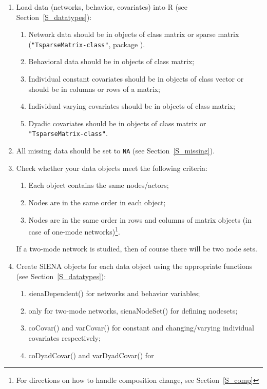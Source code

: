 \documentclass[a4paper,fleqn,11pt]{article}
\newcommand{\+}{\, + \,}
\newcommand{\sfn}[1]{\textsf{#1}}
\newcommand{\R}{{\sf R }}
\newcommand{\SI}{{\sf SIENA }}
\begin{document}
   \begin{enumerate}
	\item	Load data (networks, behavior, covariates) into \R
            (see Section~\ref{S_datatypes}):
	\begin{enumerate}
		\item Network data should be in objects of class matrix or
            sparse matrix\\ (\texttt{"TsparseMatrix-class"}, package ).
		\item	Behavioral data should be in objects of class matrix;
		\item	Individual constant covariates should be in objects of
            class vector or should be in columns or rows of a matrix;
		\item	Individual varying covariates should be in objects of class matrix;
		\item	Dyadic covariates should be in objects of class matrix
               or \texttt{"TsparseMatrix-class"}.
	\end{enumerate}
	\item	All missing data should be set to \texttt{NA} (see Section~\ref{S_missing}).
	\item Check whether your data objects meet the following criteria:
	\begin{enumerate}
		\item	Each object contains the same nodes/actors;
		\item	Nodes are in the same order in each object;
		\item	Nodes are in the same order in rows and columns of matrix
                objects (in case of one-mode networks)\footnote{For
		directions on how to handle composition change, see Section~\ref{S_comp}}.
	\end{enumerate}
   If a two-mode network is studied, then of course there will
   be two node sets.
	\item	Create \SI objects for each data object using the appropriate
                functions (see Section~\ref{S_datatypes}):
	\begin{enumerate}
		\item	\sfn{sienaDependent()} for networks and behavior variables;
		\item	only for two-mode networks, \sfn{sienaNodeSet()} for defining nodesets;
		\item	\sfn{coCovar()} and \sfn{varCovar()} for constant and
                changing/varying individual covariates respectively;
		\item	\sfn{coDyadCovar()} and \sfn{varDyadCovar()} for

\end{enumerate}
\end{enumerate}
\end{document}
